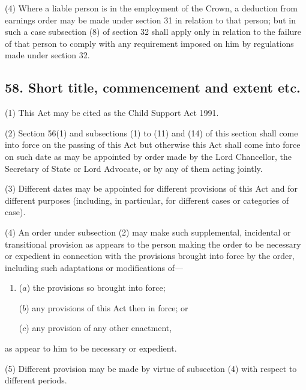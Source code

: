 \documentclass[12pt,a4paper]{article}
\begin{document}
(4)
Where a liable person is in the employment of the Crown, a deduction from earnings order may be made under section 31 in relation to that person; but in such a case subsection (8) of section 32 shall apply only in relation to the failure of that person to comply with any requirement imposed on him by regulations made under section 32.


\subsection{58. Short title, commencement and extent etc.}

(1) This Act may be cited as the Child Support Act 1991.

(2)
Section 56(1) and subsections (1) to (11) and (14) of this section shall come into force on the passing of this Act but otherwise this Act shall come into force on such date as may be appointed by order made by the Lord Chancellor, the Secretary of State or Lord Advocate, or by any of them acting jointly.

(3)
Different dates may be appointed for different provisions of this Act and for different purposes (including, in particular, for different cases or categories of case).

(4)
An order under subsection (2) may make such supplemental, incidental or transitional provision as appears to the person making the order to be necessary or expedient in connection with the provisions brought into force by the order, including such adaptations or modifications of---
\begin{enumerate}\item[]
($a$) the provisions so brought into force;

($b$) any provisions of this Act then in force; or

($c$)
any provision of any other enactment, 
\end{enumerate}
as appear to him to be necessary or expedient.

(5)
Different provision may be made by virtue of subsection (4) with respect to different periods.
\end{document}
